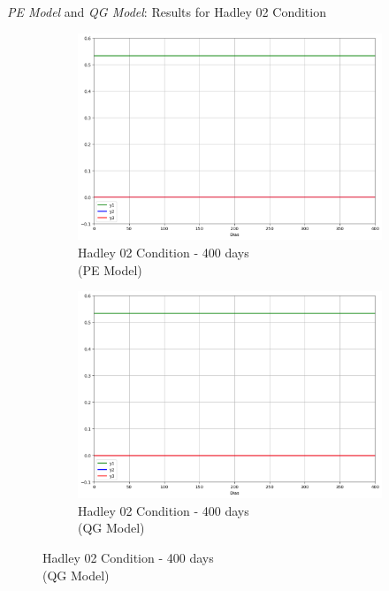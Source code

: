 \begin{frame}{\textit{PE Model} and \textit{QG Model}: Results for Hadley 02 Condition}
	\begin{figure}
		\centering
		\begin{subfigure}[b]{0.45\textwidth}
			\centering
			\includegraphics[width=\textwidth]{img/p03d400pe.png}
			\caption{Hadley 02 Condition - 400 days\\ (PE Model)}
			\label{fig:p03d400pe}
		\end{subfigure}
		\hfill
		\begin{subfigure}[b]{0.45\textwidth}
			\centering
			\includegraphics[width=\textwidth]{img/p03d400qg.png}
			\caption{Hadley 02 Condition - 400 days\\ (QG Model)}
			\label{fig:p03d400qg}
		\end{subfigure}
	\end{figure}
\end{frame}

